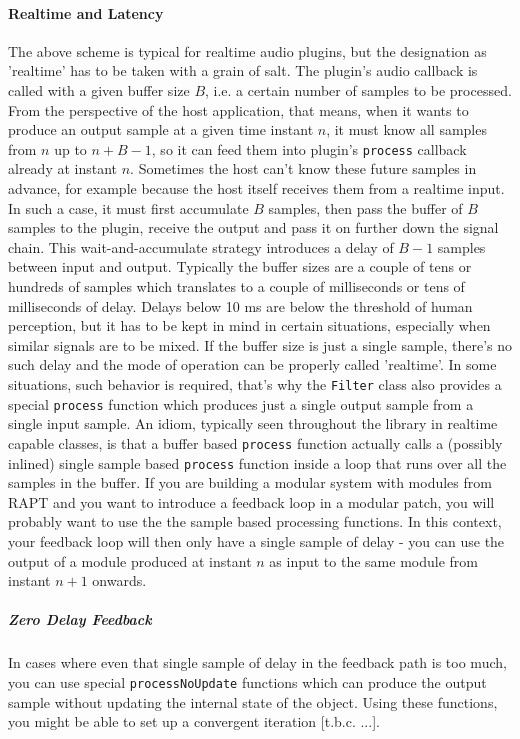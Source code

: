 \paragraph{Realtime and Latency} The above scheme is typical for realtime audio plugins, but the designation as 'realtime' has to be taken with a grain of salt. The plugin's audio callback is called with a given buffer size $B$, i.e. a certain number of samples to be processed. From the perspective of the host application, that means, when it wants to produce an output sample at a given time instant $n$, it must know all samples from $n$ up to $n+B-1$, so it can feed them into plugin's \texttt{process} callback already at instant $n$. Sometimes the host can't know these future samples in advance, for example because the host itself receives them from a realtime input. In such a case, it must first accumulate $B$ samples, then pass the buffer of $B$ samples to the plugin, receive the output and pass it on further down the signal chain. This wait-and-accumulate strategy introduces a delay of $B-1$ samples between input and output. Typically the buffer sizes are a couple of tens or hundreds of samples which translates to a couple of milliseconds or tens of milliseconds of delay. Delays below 10 ms are below the threshold of human perception, but it has to be kept in mind in certain situations, especially when similar signals are to be mixed. If the buffer size is just a single sample, there's no such delay and the mode of operation can be properly called 'realtime'. In some situations, such behavior is required, that's why the \texttt{Filter} class also provides a special \texttt{process} function which produces just a single output sample from a single input sample. An idiom, typically seen throughout the library in realtime capable classes, is that a buffer based \texttt{process} function actually calls a (possibly inlined) single sample based \texttt{process} function inside a loop that runs over all the samples in the buffer. If you are building a modular system with modules from RAPT and you want to introduce a feedback loop in a modular patch, you will probably want to use the the sample based processing functions. In this context, your feedback loop will then only have a single sample of delay - you can use the output of a module produced at instant $n$ as input to the same module from instant $n+1$ onwards.

\subparagraph{Zero Delay Feedback}
In cases where even that single sample of delay in the feedback path is too much, you can use special \texttt{processNoUpdate} functions which can produce the output sample without updating the internal state of the object. Using these functions, you might be able to set up a convergent iteration [t.b.c. ...]. %






















